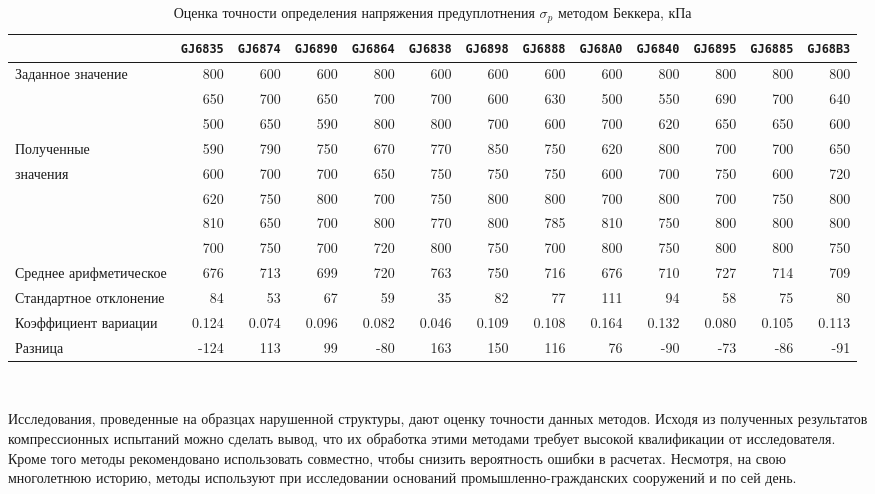 \begin{sidewaystable}[p]
    \centering
    \small
    \caption{Оценка точности определения напряжения предуплотнения $\sigma_p$ методом Беккера, кПа} \label{tab:accuracy-beck}
    \begin{tabular}{@{}lrrrrrrrrrrrr@{}}
    \toprule
    & \texttt{GJ6835} & \texttt{GJ6874} & \texttt{GJ6890} & \texttt{GJ6864} & \texttt{GJ6838} & \texttt{GJ6898} & \texttt{GJ6888} & \texttt{GJ68A0} & \texttt{GJ6840} & \texttt{GJ6895} & \texttt{GJ6885} & \texttt{GJ68B3} \\
    \midrule
    Заданное значение & 800 & 600 & 600 & 800 & 600 & 600 & 600 & 600 & 800 & 800 & 800 & 800 \\
    \midrule
     & 650 & 700 & 650 & 700 & 700 & 600 & 630 & 500 & 550 & 690 & 700 & 640 \\
     & 500 & 650 & 590 & 800 & 800 & 700 & 600 & 700 & 620 & 650 & 650 & 600 \\
    Полученные & 590 & 790 & 750 & 670 & 770 & 850 & 750 & 620 & 800 & 700 & 700 & 650 \\
    значения & 600 & 700 & 700 & 650 & 750 & 750 & 750 & 600 & 700 & 750 & 600 & 720 \\
     & 620 & 750 & 800 & 700 & 750 & 800 & 800 & 700 & 800 & 700 & 750 & 800 \\
     & 810 & 650 & 700 & 800 & 770 & 800 & 785 & 810 & 750 & 800 & 800 & 800 \\
     & 700 & 750 & 700 & 720 & 800 & 750 & 700 & 800 & 750 & 800 & 800 & 750 \\
    \midrule
    Среднее арифметическое & 676 & 713 & 699 & 720 & 763 & 750 & 716 & 676 & 710 & 727 & 714 & 709 \\
    Стандартное отклонение & 84 & 53 & 67 & 59 & 35 & 82 & 77 & 111 & 94 & 58 & 75 & 80 \\
    Коэффициент вариации & 0.124 & 0.074 & 0.096 & 0.082 & 0.046 & 0.109 & 0.108 & 0.164 & 0.132 & 0.080 & 0.105 & 0.113 \\
    \midrule
    Разница & -124 & 113 & 99 & -80 & 163 & 150 & 116 & 76 & -90 & -73 & -86 & -91 \\
    \bottomrule
    \end{tabular}
    \\ 
\end{sidewaystable}


Исследования, проведенные на образцах нарушенной структуры, дают оценку точности данных методов. Исходя из полученных результатов компрессионных испытаний можно сделать вывод, что их обработка этими методами требует высокой квалификации от исследователя. Кроме того методы рекомендовано использовать совместно, чтобы снизить вероятность ошибки в расчетах. Несмотря, на свою многолетнюю историю, методы используют при исследовании оснований промышленно-гражданских сооружений и по сей день. 

